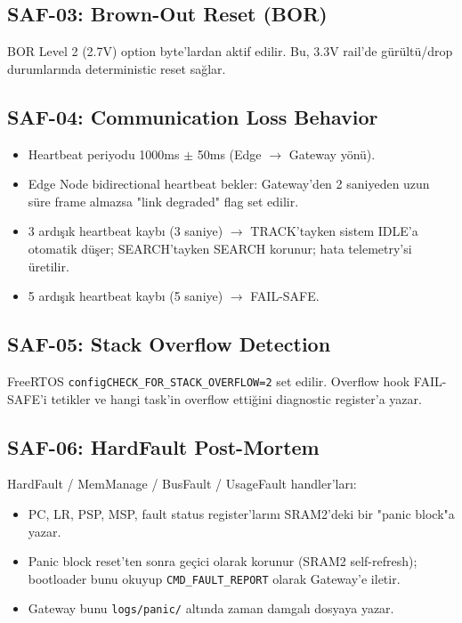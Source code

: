 \subsection{SAF-03: Brown-Out Reset (BOR)}
BOR Level 2 (2.7V) option byte'lardan aktif edilir. Bu, 3.3V rail'de gürültü/drop durumlarında deterministic reset sağlar.

\subsection{SAF-04: Communication Loss Behavior}
\begin{itemize}
    \item Heartbeat periyodu 1000ms $\pm$ 50ms (Edge $\rightarrow$ Gateway yönü).
    \item Edge Node bidirectional heartbeat bekler: Gateway'den 2 saniyeden uzun süre frame almazsa "link degraded" flag set edilir.
    \item 3 ardışık heartbeat kaybı (3 saniye) $\rightarrow$ TRACK'tayken sistem IDLE'a otomatik düşer; SEARCH'tayken SEARCH korunur; hata telemetry'si üretilir.
    \item 5 ardışık heartbeat kaybı (5 saniye) $\rightarrow$ FAIL-SAFE.
\end{itemize}

\subsection{SAF-05: Stack Overflow Detection}
FreeRTOS \texttt{configCHECK\_FOR\_STACK\_OVERFLOW=2} set edilir. Overflow hook FAIL-SAFE'i tetikler ve hangi task'in overflow ettiğini diagnostic register'a yazar.

\subsection{SAF-06: HardFault Post-Mortem}
HardFault / MemManage / BusFault / UsageFault handler'ları:
\begin{itemize}
    \item PC, LR, PSP, MSP, fault status register'larını SRAM2'deki bir "panic block"a yazar.
    \item Panic block reset'ten sonra geçici olarak korunur (SRAM2 self-refresh); bootloader bunu okuyup \texttt{CMD\_FAULT\_REPORT} olarak Gateway'e iletir.
    \item Gateway bunu \texttt{logs/panic/} altında zaman damgalı dosyaya yazar.
\end{itemize}

